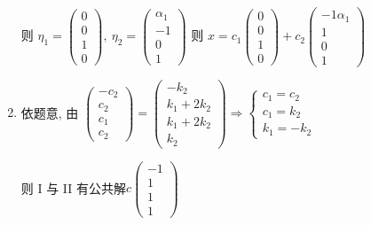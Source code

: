 \begin{enumerate}
			       则 $ \eta_{1} = \begin{pmatrix}
					       0 \\
					       0 \\
					       1 \\
					       0
				       \end{pmatrix} ,\ \eta_{2} = \begin{pmatrix}
					       \alpha_{1} \\
					       -1         \\
					       0          \\
					       1
				       \end{pmatrix} $ 则 $ x = c_{1}\begin{pmatrix}
					       0 \\
					       0 \\
					       1 \\
					       0
				       \end{pmatrix} + c_{2}\begin{pmatrix}
					       -1\alpha_{1} \\
					       1            \\
					       0            \\
					       1
				       \end{pmatrix} $
			 \item %
			       依题意, 由 \( \begin{pmatrix}
				       -c_{2} \\
				       c_{2}  \\
				       c_{1}  \\
				       c_{2}
			       \end{pmatrix} = \begin{pmatrix}
				       -k_{2}       \\
				       k_{1}+2k_{2} \\
				       k_{1}+2k_{2} \\
				       k_{2}
			       \end{pmatrix} \Rightarrow \begin{cases}
				       c_{1} = c_{2} \\
				       c_{1} = k_{2} \\
				       k_{1} = -k_{2}
			       \end{cases}\)

			       则 I 与 II 有公共解$c\begin{pmatrix}
					       -1 \\
					       1  \\
					       1  \\
					       1
				       \end{pmatrix}$
		 \end{enumerate}


